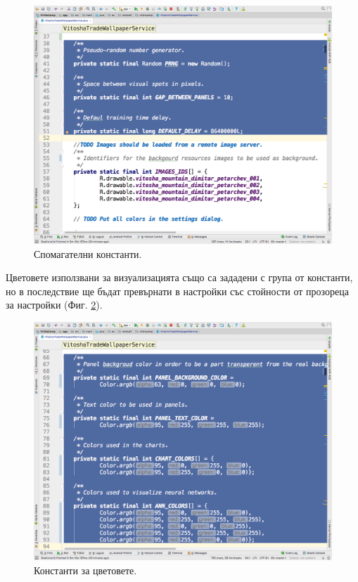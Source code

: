 \documentclass[book,14pt,oneside,openany]{memoir}
\begin{document}
\begin{figure}[h]
  \centering
  \includegraphics[height=0.45\pdfpageheight]{./images/pic0031.png}
  \caption{Спомагателни константи.}
\label{fig:pic0031}
\end{figure}
\FloatBarrier

Цветовете използвани за визуализацията също са зададени с група от константи, но в последствие ще бъдат превърнати в настройки със стойности от прозореца за настройки (Фиг. \ref{fig:pic0032}).

\begin{figure}[h]
  \centering
  \includegraphics[height=0.45\pdfpageheight]{./images/pic0032.png}
  \caption{Константи за цветовете.}
\label{fig:pic0032}
\end{figure}
\FloatBarrier
\end{document}

